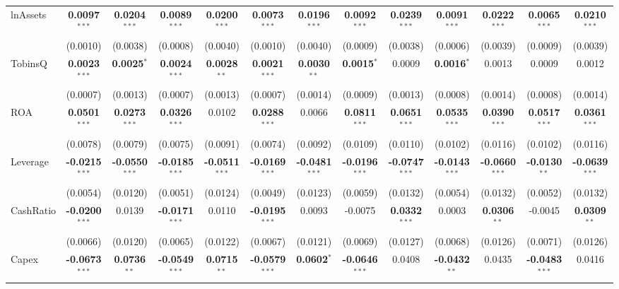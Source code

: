\documentclass[11pt,a4paper]{article}
\begin{document}
\begin{table}[htbp]
\begin{tabular}{lcccccccccccc}
\midrule
lnAssets & \textbf{0.0097}$^{***}$ & \textbf{0.0204}$^{***}$ & \textbf{0.0089}$^{***}$ & \textbf{0.0200}$^{***}$ & \textbf{0.0073}$^{***}$ & \textbf{0.0196}$^{***}$ & \textbf{0.0092}$^{***}$ & \textbf{0.0239}$^{***}$ & \textbf{0.0091}$^{***}$ & \textbf{0.0222}$^{***}$ & \textbf{0.0065}$^{***}$ & \textbf{0.0210}$^{***}$ \\
 & (0.0010) & (0.0038) & (0.0008) & (0.0040) & (0.0010) & (0.0040) & (0.0009) & (0.0038) & (0.0006) & (0.0039) & (0.0009) & (0.0039) \\
TobinsQ & \textbf{0.0023}$^{***}$ & \textbf{0.0025}$^{*}$ & \textbf{0.0024}$^{***}$ & \textbf{0.0028}$^{**}$ & \textbf{0.0021}$^{***}$ & \textbf{0.0030}$^{**}$ & \textbf{0.0015}$^{*}$ & 0.0009 & \textbf{0.0016}$^{*}$ & 0.0013 & 0.0009 & 0.0012 \\
 & (0.0007) & (0.0013) & (0.0007) & (0.0013) & (0.0007) & (0.0014) & (0.0009) & (0.0013) & (0.0008) & (0.0014) & (0.0008) & (0.0014) \\
ROA & \textbf{0.0501}$^{***}$ & \textbf{0.0273}$^{***}$ & \textbf{0.0326}$^{***}$ & 0.0102 & \textbf{0.0288}$^{***}$ & 0.0066 & \textbf{0.0811}$^{***}$ & \textbf{0.0651}$^{***}$ & \textbf{0.0535}$^{***}$ & \textbf{0.0390}$^{***}$ & \textbf{0.0517}$^{***}$ & \textbf{0.0361}$^{***}$ \\
 & (0.0078) & (0.0079) & (0.0075) & (0.0091) & (0.0074) & (0.0092) & (0.0109) & (0.0110) & (0.0102) & (0.0116) & (0.0102) & (0.0116) \\
Leverage & \textbf{-0.0215}$^{***}$ & \textbf{-0.0550}$^{***}$ & \textbf{-0.0185}$^{***}$ & \textbf{-0.0511}$^{***}$ & \textbf{-0.0169}$^{***}$ & \textbf{-0.0481}$^{***}$ & \textbf{-0.0196}$^{***}$ & \textbf{-0.0747}$^{***}$ & \textbf{-0.0143}$^{***}$ & \textbf{-0.0660}$^{***}$ & \textbf{-0.0130}$^{**}$ & \textbf{-0.0639}$^{***}$ \\
 & (0.0054) & (0.0120) & (0.0051) & (0.0124) & (0.0049) & (0.0123) & (0.0059) & (0.0132) & (0.0054) & (0.0132) & (0.0052) & (0.0132) \\
CashRatio & \textbf{-0.0200}$^{***}$ & 0.0139 & \textbf{-0.0171}$^{***}$ & 0.0110 & \textbf{-0.0195}$^{***}$ & 0.0093 & -0.0075 & \textbf{0.0332}$^{***}$ & 0.0003 & \textbf{0.0306}$^{**}$ & -0.0045 & \textbf{0.0309}$^{**}$ \\
 & (0.0066) & (0.0120) & (0.0065) & (0.0122) & (0.0067) & (0.0121) & (0.0069) & (0.0127) & (0.0068) & (0.0126) & (0.0071) & (0.0126) \\
Capex & \textbf{-0.0673}$^{***}$ & \textbf{0.0736}$^{**}$ & \textbf{-0.0549}$^{***}$ & \textbf{0.0715}$^{**}$ & \textbf{-0.0579}$^{***}$ & \textbf{0.0602}$^{*}$ & \textbf{-0.0646}$^{***}$ & 0.0408 & \textbf{-0.0432}$^{**}$ & 0.0435 & \textbf{-0.0483}$^{***}$ & 0.0416 \\

\end{tabular}
\end{table}
\end{document}
